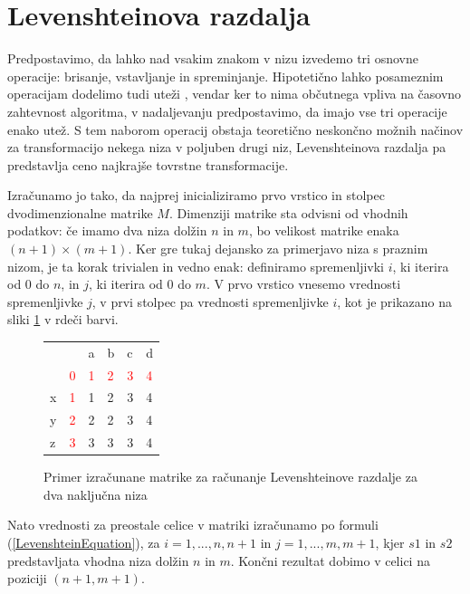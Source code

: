 \documentclass[a4paper,12pt,openright]{book}
\begin{document}
\section{Levenshteinova razdalja}

Predpostavimo, da lahko nad vsakim znakom v nizu izvedemo tri osnovne operacije: brisanje, vstavljanje in spreminjanje. Hipotetično lahko posameznim operacijam dodelimo tudi uteži \cite{weightedLevenshtein}, vendar ker to nima občutnega vpliva na časovno zahtevnost algoritma, v nadaljevanju predpostavimo, da imajo vse tri operacije enako utež. S tem naborom operacij obstaja teoretično neskončno možnih načinov za transformacijo nekega niza v poljuben drugi niz, Levenshteinova razdalja pa predstavlja ceno najkrajše tovrstne transformacije. 

Izračunamo jo tako, da najprej inicializiramo prvo vrstico in stolpec dvodimenzionalne matrike $M$. Dimenziji matrike sta odvisni od vhodnih podatkov: če imamo dva niza dolžin $n$ in $m$, bo velikost matrike enaka $(n+1) \times (m+1)$. Ker gre tukaj dejansko za primerjavo niza s praznim nizom, je ta korak trivialen in vedno enak: definiramo spremenljivki $i$, ki iterira od 0 do $n$, in $j$, ki iterira od 0 do $m$. V prvo vrstico vnesemo vrednosti spremenljivke $j$, v prvi stolpec pa vrednosti spremenljivke $i$, kot je prikazano na sliki \ref{levenshteinExample} v rdeči barvi. 

\begin{figure}[htb]
\centering
\begin{tabular}{|l|l|l|l|l|l|}
\cline{3-6}
  \multicolumn{2}{c|}{}  & a & b & c & d\\ \cline{2-6}
 \multicolumn{1}{c|}{} & \textcolor{red}{0} & \textcolor{red}{1} & \textcolor{red}{2} & \textcolor{red}{3} & \textcolor{red}{4}\\ \hline
x  & \textcolor{red}{1}  & \cellcolor{blue!15}1 &  2 & 3 & 4\\ \hline
y  & \textcolor{red}{2} & 2 & \cellcolor{blue!15}2 & 3 & 4\\ \hline
z  & \textcolor{red}{3} & 3 & 3 & \cellcolor{blue!15}3 & \cellcolor{blue!25}4 \\ \hline
\end{tabular}
\caption{Primer izračunane matrike za računanje Levenshteinove razdalje za dva naključna niza}
\label{levenshteinExample}
\end{figure}

Nato vrednosti za preostale celice v matriki izračunamo po formuli (\ref{LevenshteinEquation}), za $i=1,...,n,n+1$ in $j=1,...,m,m+1$, kjer $s1$ in $s2$ predstavljata vhodna niza dolžin $n$ in $m$. Končni rezultat dobimo v celici na poziciji $(n+1, m+1)$. 
\end{document}
